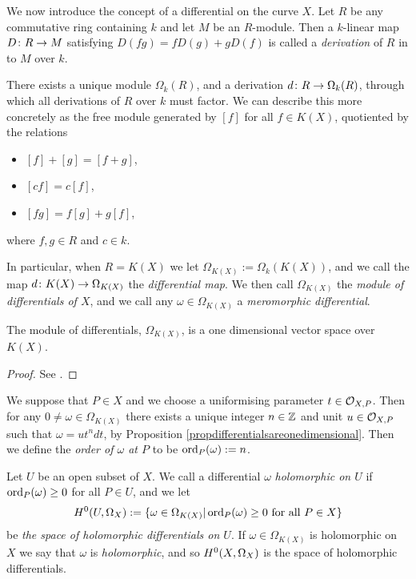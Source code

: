 We now introduce the concept of a differential on the curve $X$.
Let $R$ be any commutative ring containing $k$ and let $M$ be an $R$-module.
Then a $k$-linear map $D \colon R \rightarrow M$ satisfying $D(fg) = fD(g) + gD(f)$ is called a \emph{derivation} of $R$ in to $M$ over $k$.

There exists a unique module $\Omega_k(R)$, and a derivation $d \colon R \rightarrow \Omega_k(R)$, through which all derivations of $R$ over $k$ must factor.
We can describe this more concretely as the free module generated by $[f]$ for all $f \in K(X)$, quotiented by the relations
    \begin{itemize}
    \item $[f]+[g] = [f+g]$,
    \item $[cf] = c[f]$,
    \item $[fg] = f[g] + g[f]$,
    \end{itemize}
where $f, g \in R$ and $c \in k$.

In particular, when $R = K(X)$ we let $\Omega_{K(X)} := \Omega_k(K(X))$, and we call the map $d \colon K(X) \rightarrow \Omega_{K(X)}$ the \emph{differential map}.
We then call $\Omega_{K(X)}$ the \emph{module of differentials of $X$}, and we call any $ \omega \in \Omega_{K(X)}$ a \emph{meromorphic differential}.

    \begin{prop}\label{propdifferentialsareonedimensional}
    The module of differentials, $\Omega_{K(X)}$, is a one dimensional vector space over $K(X)$.
    \end{prop}
    \begin{proof}
    See \cite[Prop. 1.5.9]{stichtenoth}.
    \end{proof}

We suppose that $P \in X$ and we choose a uniformising parameter $t \in {\cal O}_{X,P}$.
Then for any $ 0 \neq \omega \in \Omega_{K(X)}$ there exists a unique integer $n \in {\mathbb Z}$ and unit $u \in {\cal O}_{X,P}$ such that $\omega = ut^ndt$, by Proposition \ref{propdifferentialsareonedimensional}.
Then we define the \emph{order of $\omega$ at $P$} to be $\operatorname{ord}_P(\omega) := n$.

Let $U$ be an open subset of $X$.
We call a differential $\omega$ \emph{holomorphic on $U$} if $\operatorname{ord}_P(\omega) \geq 0$ for all $P \in U$, and we let
    \[
    H^0(U, \Omega_X) := \{ \omega \in \Omega_{K(X)} | \operatorname{ord}_P(\omega) \geq 0\ \text{for all}\ P \in X\}
    \]
be \emph{the space of holomorphic differentials on $U$}.
If $\omega \in \Omega_{K(X)}$ is holomorphic on $X$ we say that $\omega$ is \emph{holomorphic}, and so ${H^0(X,\Omega_X)}$ is the space of holomorphic differentials.


